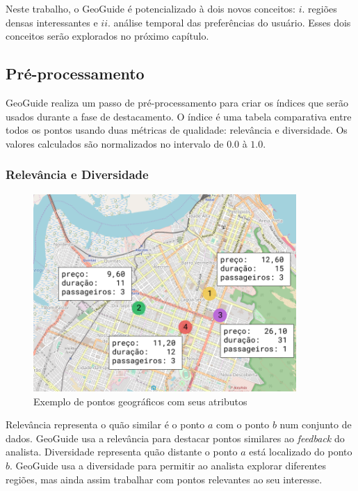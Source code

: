 Neste trabalho, o GeoGuide é potencializado à dois novos conceitos: $i$. regiões densas interessantes e $ii$. análise temporal das preferências do usuário. Esses dois conceitos serão explorados no próximo capítulo.

\subsection{Pré-processamento}

GeoGuide realiza um passo de pré-processamento para criar os índices que serão usados durante a fase de destacamento. O índice é uma tabela comparativa entre todos os pontos usando duas métricas de qualidade: relevância e diversidade. Os valores calculados são normalizados no intervalo de $0.0$ à $1.0$.

\subsubsection{Relevância e Diversidade}

\begin{figure}[t]
	\caption{Exemplo de pontos geográficos com seus atributos}
	\label{fig:exemplo-pontos}
	\centering
	\includegraphics[width=10cm]{imagens/exemplo-de-pontos}
	\mfonte
\end{figure}

Relevância representa o quão similar é o ponto $a$ com o ponto $b$ num conjunto de dados. GeoGuide usa a relevância para destacar pontos similares ao {\em feedback} do analista. Diversidade representa quão distante o ponto $a$ está localizado do ponto $b$. GeoGuide usa a diversidade para permitir ao analista explorar diferentes regiões, mas ainda assim trabalhar com pontos relevantes ao seu interesse.

